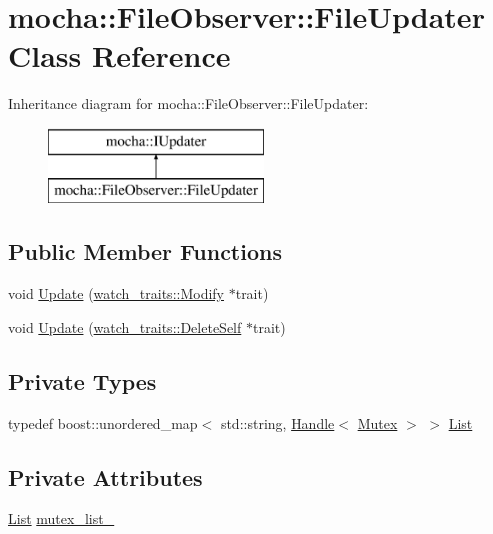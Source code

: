 \hypertarget{classmocha_1_1_file_observer_1_1_file_updater}{
\section{mocha::FileObserver::FileUpdater Class Reference}
\label{classmocha_1_1_file_observer_1_1_file_updater}
}
Inheritance diagram for mocha::FileObserver::FileUpdater:\begin{figure}[H]
\begin{center}
\leavevmode
\includegraphics[height=2.000000cm]{classmocha_1_1_file_observer_1_1_file_updater}
\end{center}
\end{figure}
\subsection*{Public Member Functions}
\begin{DoxyCompactItemize}
\item 
void \hyperlink{classmocha_1_1_file_observer_1_1_file_updater_a80a60cca8240f014e4f191bb60d82bf3}{Update} (\hyperlink{structmocha_1_1watch__traits_1_1_modify}{watch\_\-traits::Modify} $\ast$trait)
\item 
void \hyperlink{classmocha_1_1_file_observer_1_1_file_updater_a1984b103811915719d04d979275d6beb}{Update} (\hyperlink{structmocha_1_1watch__traits_1_1_delete_self}{watch\_\-traits::DeleteSelf} $\ast$trait)
\end{DoxyCompactItemize}
\subsection*{Private Types}
\begin{DoxyCompactItemize}
\item 
typedef boost::unordered\_\-map$<$ std::string, \hyperlink{classmocha_1_1_handle}{Handle}$<$ \hyperlink{classmocha_1_1_mutex}{Mutex} $>$ $>$ \hyperlink{classmocha_1_1_file_observer_1_1_file_updater_a63074c527b9a0bcb0f8a715b53535c17}{List}
\end{DoxyCompactItemize}
\subsection*{Private Attributes}
\begin{DoxyCompactItemize}
\item 
\hyperlink{classmocha_1_1_file_observer_1_1_file_updater_a63074c527b9a0bcb0f8a715b53535c17}{List} \hyperlink{classmocha_1_1_file_observer_1_1_file_updater_a12e24a3b76615c93d5fc14a3eea7354d}{mutex\_\-list\_\-}
\end{DoxyCompactItemize}
